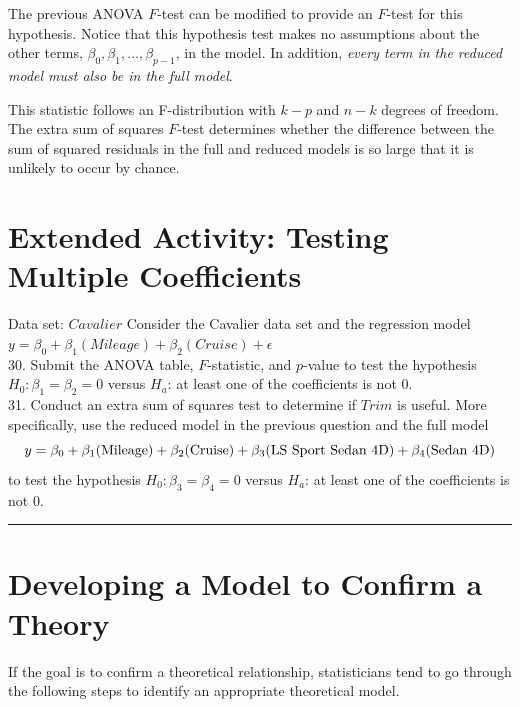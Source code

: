 \documentclass[
]{report}
\begin{document}
The previous ANOVA \(F\)-test can be modified to provide an \(F\)-test for this hypothesis. Notice that this hypothesis test makes no assumptions about the other terms, \(\beta_0, \beta_1, \dots, \beta_{p-1}\), in the model. In addition, \emph{every term in the reduced model must also be in the full model}.

This statistic follows an F-distribution with \(k-p\) and \(n-k\) degrees of freedom. The extra sum of squares \(F\)-test determines whether the difference between the sum of squared residuals in the full and reduced
models is so large that it is unlikely to occur by chance.

\section*{Extended Activity: Testing Multiple Coefficients}\label{extended-activity-testing-multiple-coefficients}

Data set: \(Cavalier\)
Consider the Cavalier data set and the regression model \(y = \beta_0 + \beta_1(Mileage) + \beta_2(Cruise) + \epsilon\)\\
30. Submit the ANOVA table, \(F\)-statistic, and \(p\)-value to test the hypothesis \(H_0: \beta_1 = \beta_2 = 0\) versus \(H_a\): at least one of the coefficients is not 0.\\
31. Conduct an extra sum of squares test to determine if \(Trim\) is useful. More specifically, use the reduced model in the previous question and the full model
\begin{equation}
y = \beta_0 + \beta_1(\text{Mileage}) + \beta_2(\text{Cruise}) + \beta_3(\text{LS Sport Sedan 4D}) + \beta_4(\text{Sedan 4D}) \notag
\end{equation}
to test the hypothesis \(H_0: \beta_3 = \beta_4 = 0\) versus \(H_a\): at least one of the coefficients is not 0.

\begin{center}\rule{0.5\linewidth}{0.5pt}\end{center}

\section{\texorpdfstring{\textbf{Developing a Model to Confirm a Theory}}{Developing a Model to Confirm a Theory}}\label{developing-a-model-to-confirm-a-theory}

If the goal is to confirm a theoretical relationship, statisticians tend to go through the following steps to identify an appropriate theoretical model.
\end{document}
